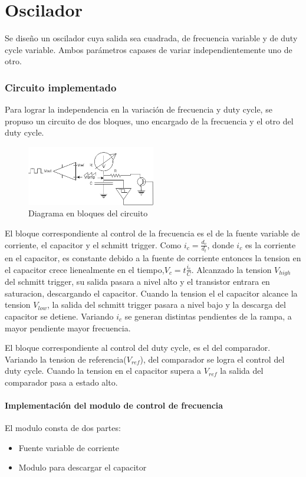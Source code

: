 \documentclass[../../ASSD_TP1_G7.tex]{subfiles}
\begin{document}
\chapter*{Oscilador}
Se dise\~no un oscilador cuya salida sea cuadrada, de frecuencia variable y de duty cycle variable. Ambos parámetros capases de variar independientemente uno de otro.
\subsection*{Circuito implementado}
Para lograr la independencia en la variación de frecuencia y duty cycle, se propuso un circuito de dos bloques, uno encargado de la frecuencia y el otro del duty cycle.
\begin{figure}[H]
\centering
\includegraphics[width=0.5\textwidth]{figures/diagBloques.png}
\caption{Diagrama en bloques del circuito}
\end{figure}
\par El bloque correspondiente al control de la frecuencia es el de la fuente variable de corriente, el capacitor y el schmitt trigger. Como $i_c=\frac{d_v}{d_t}$, donde $i_c$ es la corriente en el capacitor, es constante debido a la fuente de corriente entonces la tension en el capacitor crece lienealmente en el tiempo,$V_c=t \frac{i_c}{C}$. Alcanzado la tension $V_{high}$ del schmitt trigger, su salida pasara a nivel alto y el transistor entrara en saturacion, descargando el capacitor. Cuando la tension el el capacitor alcance la tension $V_{low}$, la salida del schmitt trigger pasara a nivel bajo y la descarga del capacitor se detiene.
Variando $i_c$ se generan distintas pendientes de la rampa, a mayor pendiente mayor frecuencia. 
\par El bloque correspondiente al control del duty cycle, es el del comparador. Variando la tension de referencia($V_{ref} $), del comparador se logra el control del duty cycle. Cuando la tension en el capacitor supera a $V_{ref} $ la salida del comparador pasa a estado alto.
\subsubsection*{Implementación del modulo de control de frecuencia}
El modulo consta de dos partes:
\begin{itemize}
  \item Fuente variable de corriente
  \item Modulo para descargar el capacitor
\end{itemize}
\end{document}
